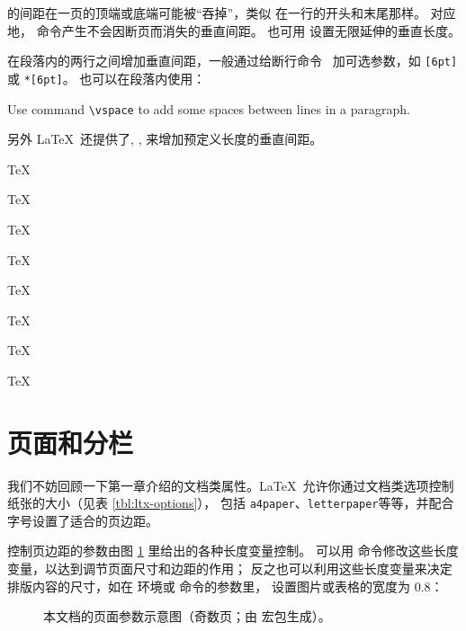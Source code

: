  的间距在一页的顶端或底端可能被“吞掉”，类似  在一行的开头和末尾那样。
对应地， 命令产生不会因断页而消失的垂直间距。 也可用  设置无限延伸的垂直长度。

在段落内的两行之间增加垂直间距，一般通过给断行命令 \crcmd\ 加可选参数，如 \crcmd\texttt{[6pt]} 或 \crcmd\texttt{*[6pt]}。
 也可以在段落内使用：
\begin{example}
Use command \verb|\vspace| to
add \vspace{12pt} some spaces
between lines in a paragraph.
\end{example}

另外 \LaTeX\ 还提供了, ,  来增加预定义长度的垂直间距。
\begin{example}
\parbox[t]{3em}{TeX\par TeX}
\parbox[t]{3em}{TeX\par\smallskip TeX}
\parbox[t]{3em}{TeX\par\medskip TeX}
\parbox[t]{3em}{TeX\par\bigskip TeX}
\end{example}

\section{页面和分栏}\label{sec:page-columns}

我们不妨回顾一下第一章介绍的文档类属性。\LaTeX\ 允许你通过文档类选项控制纸张的大小（见表 \ref{tbl:ltx-options}），
包括 \texttt{a4paper}、\texttt{letterpaper}等等，并配合字号设置了适合的页边距。

控制页边距的参数由图 \ref{fig:layouts} 里给出的各种长度变量控制。
可以用  命令修改这些长度变量，以达到调节页面尺寸和边距的作用；
反之也可以利用这些长度变量来决定排版内容的尺寸，如在  环境或  命令的参数里，
设置图片或表格的宽度为 0.8：

\begin{figure}[!p]
\centering
\layoutpicture*
\caption{本文档的页面参数示意图（奇数页；由  宏包生成）。} \label{fig:layouts}
\end{figure}

